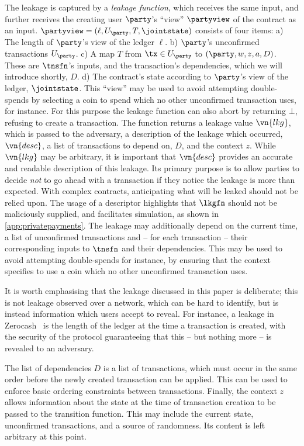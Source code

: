 The leakage is captured by a \emph{leakage function}, which receives the same
input, and further receives the creating user $\party$'s ``view'' $\partyview$ of the
contract as an input. $\partyview = (\ell, U_\party, T, \jointstate)$ consists of four items: a) The
length of $\party$'s view of the ledger $\ell$. b) $\party$'s unconfirmed
transactions $U_\party$. c) A map $T$ from $\tx \in U_\party$ to $(\party, w,
z,\allowbreak a, D)$. These are $\tnsfn$'s inputs, and the transaction's dependencies, which we will introduce
shortly, $D$. d) The contract's state according to $\party$'s view of the ledger,
$\jointstate$. This ``view'' may be used to avoid attempting
double-spends by selecting a coin to spend which no other unconfirmed
transaction uses, for instance. For this purpose the leakage
function can also abort by returning $\bot$, refusing to create a transaction.
The function returns a leakage value $\vn{lkg}$, which is passed to the
adversary, a description of the leakage which occurred, $\vn{desc}$, a list
of transactions to depend on, $D$, and the context $z$. While $\vn{lkg}$ may be
arbitrary, it is important that $\vn{desc}$ provides an accurate and readable
description of this leakage. Its primary purpose is to allow parties to decide
\emph{not} to go ahead with a transaction if they notice the leakage is more
than expected. With complex contracts, anticipating what will be leaked should
not be relied upon. The usage of a descriptor highlights that
  $\lkgfn$ should not be maliciously supplied, and facilitates simulation, as
  shown in \autoref{app:privatepayments}.
The leakage may additionally depend on the current time, a list of
  unconfirmed transactions and -- for each transaction -- their corresponding
  inputs to $\tnsfn$ and their dependencies. This may be used to avoid
  attempting double-spends for instance, by ensuring that the context specifies
  to use a coin which no other unconfirmed transaction uses.

It is worth emphasising that the leakage discussed in this paper is
  deliberate; this is not leakage observed over a network, which can be hard to
  identify, but is instead information which users accept to reveal. For
  instance, a leakage in Zerocash~\cite{SP:BCGGMT14} is the length of the ledger at the time a
  transaction is created, with the security of the protocol guaranteeing that
  this -- but nothing more -- is revealed to an adversary.

The list of dependencies $D$ is a list of transactions, which must occur
in the same order before the newly created transaction can be applied. This can
be used to enforce basic ordering constraints between transactions. Finally, the
context $z$ allows information about the state at the time of transaction
creation to be passed to the transition function. This may include the current
state, unconfirmed transactions, and a source of randomness. Its content is left
arbitrary at this point.

